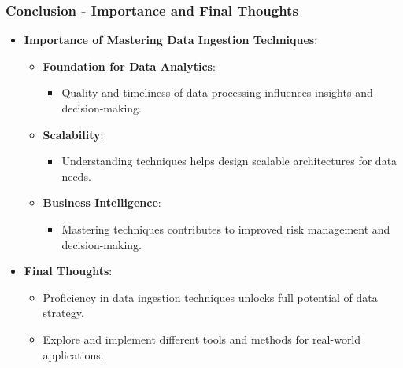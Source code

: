\documentclass[aspectratio=169]{beamer}
\begin{document}
\begin{frame}[fragile]
    \frametitle{Conclusion - Importance and Final Thoughts}

    \begin{itemize}
        \item \textbf{Importance of Mastering Data Ingestion Techniques}:
        \begin{itemize}
            \item \textbf{Foundation for Data Analytics}:
            \begin{itemize}
                \item Quality and timeliness of data processing influences insights and decision-making.
            \end{itemize}
            \item \textbf{Scalability}:
            \begin{itemize}
                \item Understanding techniques helps design scalable architectures for data needs.
            \end{itemize}
            \item \textbf{Business Intelligence}:
            \begin{itemize}
                \item Mastering techniques contributes to improved risk management and decision-making.
            \end{itemize}
        \end{itemize}

        \item \textbf{Final Thoughts}:
        \begin{itemize}
            \item Proficiency in data ingestion techniques unlocks full potential of data strategy.
            \item Explore and implement different tools and methods for real-world applications.
        \end{itemize}
    \end{itemize}
\end{frame}
\end{document}
